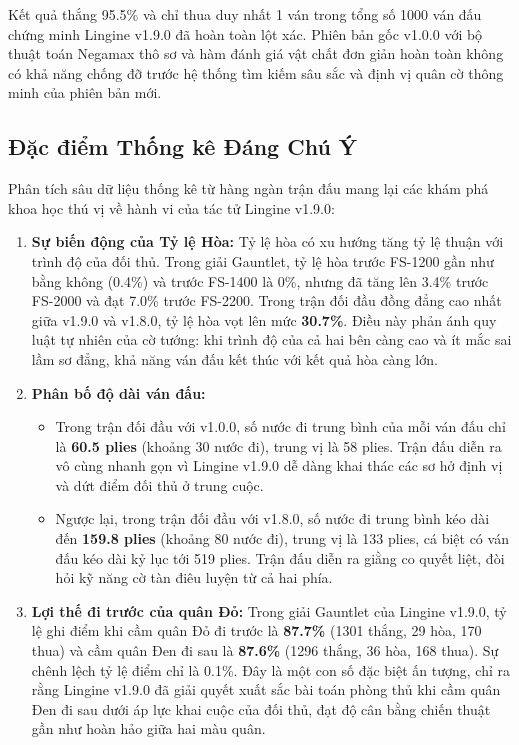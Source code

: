 Kết quả thắng 95.5\% và chỉ thua duy nhất 1 ván trong tổng số 1000 ván đấu chứng minh Lingine v1.9.0 đã hoàn toàn lột xác. Phiên bản gốc v1.0.0 với bộ thuật toán Negamax thô sơ và hàm đánh giá vật chất đơn giản hoàn toàn không có khả năng chống đỡ trước hệ thống tìm kiếm sâu sắc và định vị quân cờ thông minh của phiên bản mới.

\subsection{Đặc điểm Thống kê Đáng Chú Ý}

Phân tích sâu dữ liệu thống kê từ hàng ngàn trận đấu mang lại các khám phá khoa học thú vị về hành vi của tác tử Lingine v1.9.0:

\begin{enumerate}
    \item \textbf{Sự biến động của Tỷ lệ Hòa:} Tỷ lệ hòa có xu hướng tăng tỷ lệ thuận với trình độ của đối thủ. Trong giải Gauntlet, tỷ lệ hòa trước FS-1200 gần như bằng không (0.4\%) và trước FS-1400 là 0\%, nhưng đã tăng lên 3.4\% trước FS-2000 và đạt 7.0\% trước FS-2200. Trong trận đối đầu đồng đẳng cao nhất giữa v1.9.0 và v1.8.0, tỷ lệ hòa vọt lên mức \textbf{30.7\%}. Điều này phản ánh quy luật tự nhiên của cờ tướng: khi trình độ của cả hai bên càng cao và ít mắc sai lầm sơ đẳng, khả năng ván đấu kết thúc với kết quả hòa càng lớn.
    \item \textbf{Phân bố độ dài ván đấu:}
    \begin{itemize}
        \item Trong trận đối đầu với v1.0.0, số nước đi trung bình của mỗi ván đấu chỉ là \textbf{60.5 plies} (khoảng 30 nước đi), trung vị là 58 plies. Trận đấu diễn ra vô cùng nhanh gọn vì Lingine v1.9.0 dễ dàng khai thác các sơ hở định vị và dứt điểm đối thủ ở trung cuộc.
        \item Ngược lại, trong trận đối đầu với v1.8.0, số nước đi trung bình kéo dài đến \textbf{159.8 plies} (khoảng 80 nước đi), trung vị là 133 plies, cá biệt có ván đấu kéo dài kỷ lục tới 519 plies. Trận đấu diễn ra giằng co quyết liệt, đòi hỏi kỹ năng cờ tàn điêu luyện từ cả hai phía.
    \end{itemize}
    \item \textbf{Lợi thế đi trước của quân Đỏ:} Trong giải Gauntlet của Lingine v1.9.0, tỷ lệ ghi điểm khi cầm quân Đỏ đi trước là \textbf{87.7\%} (1301 thắng, 29 hòa, 170 thua) và cầm quân Đen đi sau là \textbf{87.6\%} (1296 thắng, 36 hòa, 168 thua). Sự chênh lệch tỷ lệ điểm chỉ là 0.1\%. Đây là một con số đặc biệt ấn tượng, chỉ ra rằng Lingine v1.9.0 đã giải quyết xuất sắc bài toán phòng thủ khi cầm quân Đen đi sau dưới áp lực khai cuộc của đối thủ, đạt độ cân bằng chiến thuật gần như hoàn hảo giữa hai màu quân.
\end{enumerate}



